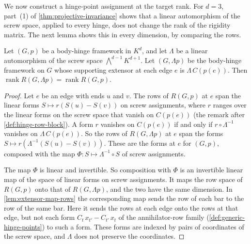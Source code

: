 We now construct a hinge-point assignment at the target rank. For
$d = 3$, part~(1) of \cref{thm:projective-invariance} shows that a
linear automorphism of the screw space, applied to every hinge, does
not change the rank of the rigidity matrix. The next lemma shows this
in every dimension, by comparing the rows.

\begin{lemma}
  \label{lem:screw-map-rows}
  \leanok
  Let $(G, p)$ be a body-hinge framework in $K^d$, and let $\Lambda$ be
  a linear automorphism of the screw space $\bigwedge^{d-1}K^{d+1}$.
  Let $(G, \Lambda p)$ be the body-hinge framework on $G$ whose
  supporting extensor at each edge $e$ is $\Lambda\, C(p(e))$. Then
  $\operatorname{rank} R(G, \Lambda p) = \operatorname{rank} R(G, p)$.
\end{lemma}
\begin{proof}
  \leanok
  Let $e$ be an edge with ends $u$ and $v$. The rows of $R(G, p)$ at
  $e$ span the linear forms $S \mapsto r(S(u) - S(v))$ on screw
  assignments, where $r$ ranges over the linear forms on the screw
  space that vanish on $C(p(e))$ (the remark after
  \cref{def:hinge-row-block}). A form $r$ vanishes on $C(p(e))$ if and
  only if $r \circ \Lambda^{-1}$ vanishes on $\Lambda\, C(p(e))$. So
  the rows of $R(G, \Lambda p)$ at $e$ span the forms
  $S \mapsto r(\Lambda^{-1}(S(u) - S(v)))$. These are the forms at $e$
  for $(G, p)$, composed with the map $\Phi \colon S \mapsto
  \Lambda^{-1} \circ S$ of screw assignments.

  The map $\Phi$ is linear and invertible. So composition with $\Phi$
  is an invertible linear map of the space of linear forms on screw
  assignments. It maps the row space of $R(G, p)$ onto that of
  $R(G, \Lambda p)$, and the two have the same dimension. In
  \cref{lem:extensor-map-rows} the corresponding map sends the row of
  each bar to the row of the same bar. Here it sends the rows at each
  edge onto the rows at that edge, but not each form
  $C_t\, x_{t'} - C_{t'}\, x_t$ of the annihilator-row family
  (\cref{def:generic-hinge-points}) to such a form. These forms are
  indexed by pairs of coordinates of the screw space, and $\Lambda$
  does not preserve the coordinates.
\end{proof}

